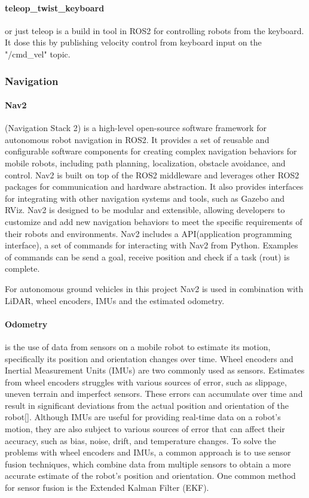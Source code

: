 \paragraph{teleop_twist_keyboard} or just teleop is a build in tool in ROS2 for controlling robots from the keyboard. It dose this by publishing velocity control from keyboard input on the "/cmd\_vel" topic.   

\subsubsection{Navigation} 


\paragraph{Nav2} (Navigation Stack 2) \cite{rosnavigation} is a high-level open-source software framework for autonomous robot navigation in ROS2. It provides a set of reusable and configurable software components for creating complex navigation behaviors for mobile robots, including path planning, localization, obstacle avoidance, and control. Nav2 is built on top of the ROS2 middleware and leverages other ROS2 packages for communication and hardware abstraction. It also provides interfaces for integrating with other navigation systems and tools, such as Gazebo and RViz. Nav2 is designed to be modular and extensible, allowing developers to customize and add new navigation behaviors to meet the specific requirements of their robots and environments.
Nav2 includes a API(application programming interface)\cite{rosnavAPI}, a set of commands for interacting with Nav2 from Python. Examples of commands can be send a goal, receive position and check if a task (rout) is complete.  

For autonomous ground vehicles in this project Nav2 is used in combination with LiDAR, wheel encoders, IMUs and the estimated odometry. 

\paragraph{Odometry} is the use of data from sensors on a mobile robot to estimate its motion, specifically its position and orientation changes over time. Wheel encoders and Inertial Measurement Units (IMUs) are two commonly used as sensors. Estimates from wheel encoders struggles with various sources of error, such as slippage, uneven terrain and imperfect sensors. These errors can accumulate over time and result in significant deviations from the actual position and orientation of the robot[]. Although IMUs are useful for providing real-time data on a robot's motion, they are also subject to various sources of error that can affect their accuracy, such as bias, noise, drift, and temperature changes. 
To solve the problems with wheel encoders and IMUs, a common approach is to use sensor fusion techniques, which combine data from multiple sensors to obtain a more accurate estimate of the robot's position and orientation. One common method for sensor fusion is the Extended Kalman Filter (EKF). 

